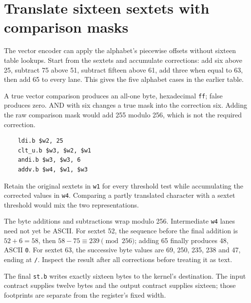 \section{Translate sixteen sextets with comparison masks}
The vector encoder can apply the alphabet's piecewise offsets without sixteen table
lookups. Start from the sextets and accumulate corrections: add six above 25, subtract
75 above 51, subtract fifteen above 61, add three when equal to 63, then add 65 to every
lane. This gives the five alphabet cases in the earlier table.

A true vector comparison produces an all-one byte, hexadecimal \texttt{ff}; false
produces zero. AND with six changes a true mask into the correction six. Adding the
raw comparison mask would add 255 modulo 256, which is not the required correction.

\begin{verbatim}
    ldi.b $w2, 25
    clt_u.b $w3, $w2, $w1
    andi.b $w3, $w3, 6
    addv.b $w4, $w1, $w3
\end{verbatim}

Retain the original sextets in \texttt{w1} for every threshold test while accumulating
the corrected values in \texttt{w4}. Comparing a partly translated character with a
sextet threshold would mix the two representations.

The byte additions and subtractions wrap modulo 256. Intermediate \texttt{w4} lanes
need not yet be ASCII. For sextet 52, the sequence before the final addition is
\(52+6=58\), then \(58-75\equiv239\pmod{256}\); adding 65 finally produces 48,
ASCII \texttt{0}. For sextet 63, the successive byte values are 69, 250, 235, 238 and
47, ending at \texttt{/}. Inspect the result after all corrections before treating it
as text.

The final \texttt{st.b} writes exactly sixteen bytes to the kernel's destination.
The input contract supplies twelve bytes and the output contract supplies sixteen;
those footprints are separate from the register's fixed width.
